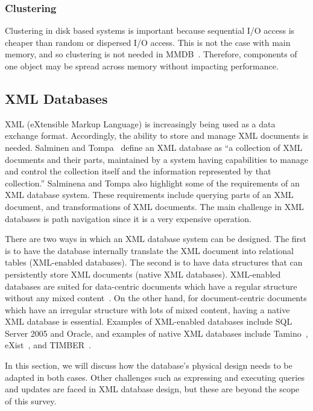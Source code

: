 \documentclass[12pt,a4paper]{article}
\begin{document}
\subsubsection{Clustering}
Clustering in disk based systems is important because sequential I/O access is cheaper than random or dispersed I/O access. This is not the case with main
memory, and so clustering is not needed in MMDB~\cite{garcia1992main, moldovan2008databases}. Therefore, components of one object may be spread across memory
without impacting performance.

\subsection{XML Databases}
\label{SEC-XML}

XML (eXtensible Markup Language) is increasingly being used as a data exchange format. Accordingly, the ability to store and manage XML documents is needed.
Salminen and Tompa~\cite{salminen2001requirements} define an XML database as ``a collection of XML documents and their parts, maintained by a system
having capabilities to manage and control the collection itself and the information represented by that collection.'' Salminena and Tompa also highlight some of
the requirements of an XML database system. These requirements include querying parts of an XML document, and
transformations of XML documents. The main challenge in XML databases is path navigation since it is a very expensive operation.

There are two ways in which an XML database system can be designed. The first is to have the database internally translate the XML document into relational
tables (XML-enabled databases). The second is to have data structures that can persistently store XML documents (native XML databases). XML-enabled databases
are suited for data-centric documents which have a regular structure without any mixed content~\cite{bourret2003xml}. On the other hand, for document-centric
documents which have an irregular structure with lots of mixed content, having a native XML database is essential. Examples of XML-enabled databases include SQL
Server 2005 and Oracle, and examples of native XML databases include Tamino~\cite{taminodb},
eXist~\cite{meier2009exist}, and TIMBER~\cite{jagadish2002timber}.

In this section, we will discuss how the database's physical design needs to be adapted in both cases. Other challenges such as expressing and executing queries
and updates are faced in XML database design, but these are beyond the scope of this survey.
\end{document}

